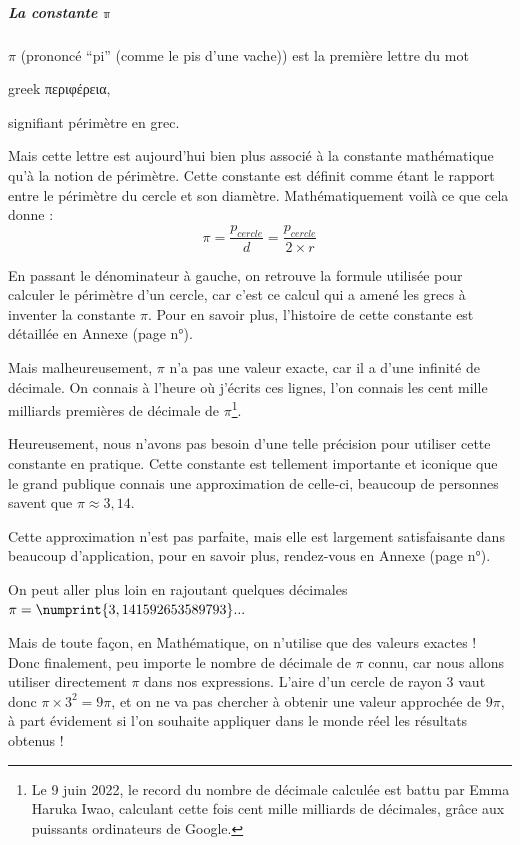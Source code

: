 \documentclass[a4paper, twoside]{article}
\begin{document}
\subparagraph*{La constante $\mathbb{\pi}$}

$\pi$ (prononcé “pi” (comme le pis d'une vache)) est la première lettre du mot
\begin{otherlanguage*}{greek}
	περιφέρεια,
\end{otherlanguage*}
signifiant périmètre en grec.

Mais cette lettre est aujourd'hui bien plus associé à la constante mathématique
qu'à la notion de périmètre.
Cette constante est définit comme étant le rapport entre
le périmètre du cercle et son diamètre. Mathématiquement
voilà ce que cela donne : $$\pi = \frac{p_{cercle}}{d} = \frac{p_{cercle}}{2 \times r}$$

En passant le dénominateur à gauche,
on retrouve la formule utilisée pour calculer le périmètre d'un cercle,
car c'est ce calcul qui a amené les grecs à inventer la constante $\pi$.
Pour en savoir plus, l'histoire de cette constante est détaillée en Annexe (page n°\pageref*{histoire_de_pi}).

\medbreak

Mais malheureusement, $\pi$ n'a pas une valeur exacte,
car il a d'une infinité de décimale. On connais à l'heure où j'écrits ces lignes,
l'on connais les cent mille milliards premières de décimale de $\pi$\footnote{
	Le 9 juin 2022, le record du nombre de décimale calculée est battu par Emma Haruka Iwao,
	calculant cette fois cent mille milliards de décimales,
	grâce aux puissants ordinateurs de Google.}.%

Heureusement, nous n'avons pas besoin d'une telle précision pour
utiliser cette constante en pratique. Cette constante est tellement importante
et iconique que le grand publique connais une approximation de celle-ci,
beaucoup de personnes savent que $\pi \approx 3,14$.

Cette approximation n'est pas parfaite, mais elle est largement
satisfaisante dans beaucoup d'application, pour en savoir plus, rendez-vous en Annexe (page n°\pageref*{approximations_pi}).

On peut aller plus loin en rajoutant quelques décimales $\pi = \numprint{3,141592653589793}...$

\medbreak

Mais de toute façon, en Mathématique, on n'utilise que des valeurs exactes !
Donc finalement, peu importe le nombre de décimale de $\pi$ connu, car nous allons utiliser
directement $\pi$ dans nos expressions. L'aire d'un cercle de rayon 3 vaut donc $\pi \times 3^2 = 9 \pi$, et
on ne va pas chercher à obtenir une valeur approchée de $9 \pi$, à part évidement si
l'on souhaite appliquer dans le monde réel les résultats obtenus !
\end{document}
